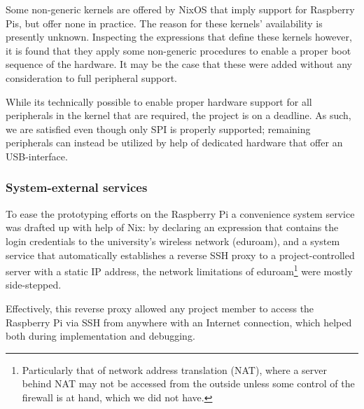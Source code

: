 Some non-generic kernels are offered by NixOS that imply support for Raspberry Pis, but offer none in practice.
The reason for these kernels' availability is presently unknown.
Inspecting the expressions that define these kernels however, it is found that they apply some non-generic procedures to enable a proper boot sequence of the hardware.
It may be the case that these were added without any consideration to full peripheral support.

While its technically possible to enable proper hardware support for all peripherals in the kernel that are required,
the project is on a deadline.
As such, we are satisfied even though only SPI is properly supported;
remaining peripherals can instead be utilized by help of dedicated hardware that offer an USB-interface.

\subsubsection{System-external services}
To ease the prototyping efforts on the Raspberry Pi a convenience system service was drafted up with help of Nix:
by declaring an expression that contains the login credentials to the university's wireless network (eduroam),
and a system service that automatically establishes a reverse SSH proxy to a project-controlled server with a static IP address,
the network limitations of eduroam\footnote{Particularly that of network address translation (NAT), where a server behind NAT may not be accessed from the outside unless some control of the firewall is at hand, which we did not have.} were mostly side-stepped.

Effectively, this reverse proxy allowed any project member to access the Raspberry Pi via SSH from anywhere with an Internet connection,
which helped both during implementation and debugging.


